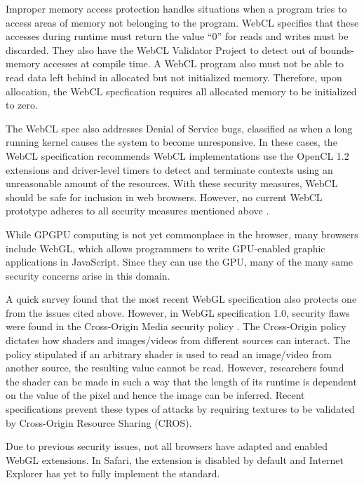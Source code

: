 Improper memory access protection handles situations when a program tries to
access areas of memory not belonging to the program. WebCL specifies that these
accesses during runtime must return the value ``0'' for reads and writes must be
discarded. They also have the WebCL Validator Project \cite{webclValidator} to
detect out of bounds-memory accesses at compile time. A WebCL program also must
not be able to read data left behind in allocated but not initialized memory.
Therefore, upon allocation, the WebCL specfication requires all allocated memory
to be initialized to zero.

The WebCL spec also addresses Denial of Service bugs, classified as when a long
running kernel causes the system to become unresponsive. In these cases, the
WebCL specification recommends WebCL implementations use the OpenCL 1.2
extensions and driver-level timers to detect and terminate contexts using an
unreasonable amount of the resources.  With these security measures, WebCL
should be safe for inclusion in web browsers. However, no current WebCL
prototype adheres to all security measures mentioned above \cite{nokiasecurity}.

While GPGPU computing is not yet commonplace in the browser, many browsers include
WebGL, which allows programmers to write GPU-enabled graphic applications in
JavaScript. Since they can use the GPU, many of the many same security concerns
arise in this domain. 

A quick survey found that the most recent WebGL specification also protects one
from the issues cited above.  However, in WebGL specification 1.0, security
flaws were found in the Cross-Origin Media security policy \cite{webGLerror1,
webGLerror2}. The Cross-Origin policy dictates how shaders and images/videos
from different sources can interact. The policy stipulated if an arbitrary
shader is used to read an image/video from another source, the resulting value
cannot be read.  However, researchers found the shader can be made in such a way
that the length of its runtime is dependent on the value of the pixel and hence
the image can be inferred. Recent specifications prevent these types of attacks
by requiring textures to be validated by Cross-Origin Resource Sharing (CROS).

Due to previous security issues, not all browsers have adapted and enabled WebGL
extensions. In Safari, the extension is disabled by default and Internet
Explorer has yet to fully implement the standard.

